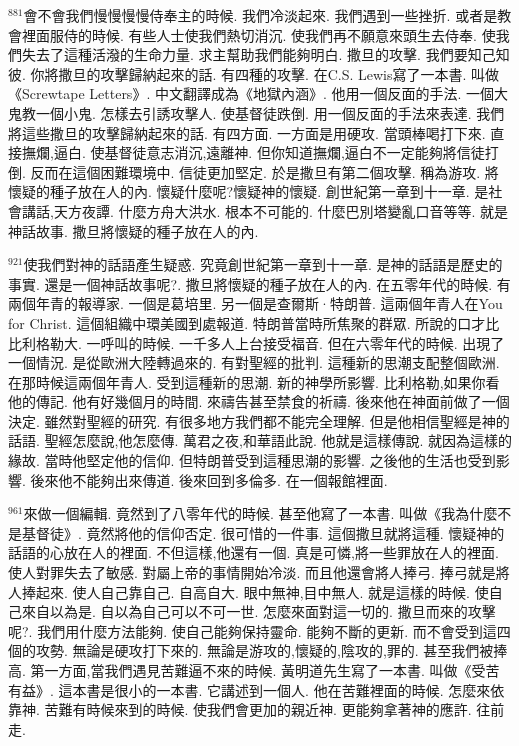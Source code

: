 \documentclass{book}
\begin{document}
$^{881}$會不會我們慢慢慢慢侍奉主的時候.
我們冷淡起來.
我們遇到一些挫折.
或者是教會裡面服侍的時候.
有些人士使我們熱切消沉.
使我們再不願意來頭生去侍奉.
使我們失去了這種活潑的生命力量.
求主幫助我們能夠明白.
撒旦的攻擊.
我們要知己知彼.
你將撒旦的攻擊歸納起來的話.
有四種的攻擊.
在C.S. Lewis寫了一本書.
叫做《Screwtape Letters》.
中文翻譯成為《地獄內涵》.
他用一個反面的手法.
一個大鬼教一個小鬼.
怎樣去引誘攻擊人.
使基督徒跌倒.
用一個反面的手法來表達.
我們將這些撒旦的攻擊歸納起來的話.
有四方面.
一方面是用硬攻.
當頭棒喝打下來.
直接撫爛,逼白.
使基督徒意志消沉,遠離神.
但你知道撫爛,逼白不一定能夠將信徒打倒.
反而在這個困難環境中.
信徒更加堅定.
於是撒旦有第二個攻擊.
稱為游攻.
將懷疑的種子放在人的內.
懷疑什麼呢?懷疑神的懷疑.
創世紀第一章到十一章.
是社會講話,天方夜譚.
什麼方舟大洪水.
根本不可能的.
什麼巴別塔變亂口音等等.
就是神話故事.
撒旦將懷疑的種子放在人的內.

$^{921}$使我們對神的話語產生疑惑.
究竟創世紀第一章到十一章.
是神的話語是歷史的事實.
還是一個神話故事呢?.
撒旦將懷疑的種子放在人的內.
在五零年代的時候.
有兩個年青的報導家.
一個是葛培里.
另一個是查爾斯·特朗普.
這兩個年青人在You for Christ.
這個組織中環美國到處報道.
特朗普當時所焦聚的群眾.
所說的口才比比利格勒大.
一呼叫的時候.
一千多人上台接受福音.
但在六零年代的時候.
出現了一個情況.
是從歐洲大陸轉過來的.
有對聖經的批判.
這種新的思潮支配整個歐洲.
在那時候這兩個年青人.
受到這種新的思潮.
新的神學所影響.
比利格勒,如果你看他的傳記.
他有好幾個月的時間.
來禱告甚至禁食的祈禱.
後來他在神面前做了一個決定.
雖然對聖經的研究.
有很多地方我們都不能完全理解.
但是他相信聖經是神的話語.
聖經怎麼說,他怎麼傳.
萬君之夜,和華語此說.
他就是這樣傳說.
就因為這樣的緣故.
當時他堅定他的信仰.
但特朗普受到這種思潮的影響.
之後他的生活也受到影響.
後來他不能夠出來傳道.
後來回到多倫多.
在一個報館裡面.

$^{961}$來做一個編輯.
竟然到了八零年代的時候.
甚至他寫了一本書.
叫做《我為什麼不是基督徒》.
竟然將他的信仰否定.
很可惜的一件事.
這個撒旦就將這種.
懷疑神的話語的心放在人的裡面.
不但這樣,他還有一個.
真是可憐,將一些罪放在人的裡面.
使人對罪失去了敏感.
對屬上帝的事情開始冷淡.
而且他還會將人捧弓.
捧弓就是將人捧起來.
使人自己靠自己.
自高自大.
眼中無神,目中無人.
就是這樣的時候.
使自己來自以為是.
自以為自己可以不可一世.
怎麼來面對這一切的.
撒旦而來的攻擊呢?.
我們用什麼方法能夠.
使自己能夠保持靈命.
能夠不斷的更新.
而不會受到這四個的攻勢.
無論是硬攻打下來的.
無論是游攻的,懷疑的,陰攻的,罪的.
甚至我們被捧高.
第一方面,當我們遇見苦難逼不來的時候.
黃明道先生寫了一本書.
叫做《受苦有益》.
這本書是很小的一本書.
它講述到一個人.
他在苦難裡面的時候.
怎麼來依靠神.
苦難有時候來到的時候.
使我們會更加的親近神.
更能夠拿著神的應許.
往前走.
\end{document}
